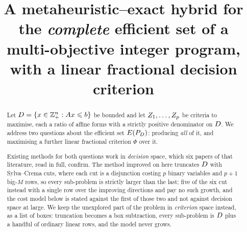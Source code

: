 \documentclass[11pt,a4paper]{article}
\title{\bfseries A metaheuristic--exact hybrid for the \emph{complete} efficient
set of a multi-objective integer program,\\ with a linear fractional decision
criterion}
\author{}
\date{}
\begin{document}
\maketitle

\begin{abstract}
\noindent
Let $D = \{x \in \mathbb{Z}^{n}_{+} : Ax \leqslant b\}$ be bounded and let
$Z_1,\dots,Z_p$ be criteria to maximise, each a ratio of affine forms with a
strictly positive denominator on $D$.  We address two questions about the
efficient set $E(P_{D})$: producing \emph{all} of it, and maximising a further linear
fractional criterion $\Phi$ over it.

Existing methods for both questions work in \emph{decision} space, which six
papers of that literature, read in full, confirm.  The method improved on here
truncates $D$ with Sylva--Crema cuts, where each cut is a disjunction
costing $p$ binary variables and $p+1$ big-$M$ rows, so every sub-problem is
strictly larger than the last; five of the six cut instead with a single row
over the improving directions and pay no such growth, and the cost model below
is stated against the first of those two and not against decision space at
large.  We keep the unexplored part of the problem in \emph{criterion} space
instead, as a list of boxes: truncation becomes a box subtraction, every
sub-problem is $D$ plus a handful of ordinary linear rows, and the model
never grows.


\end{abstract}
\end{document}
